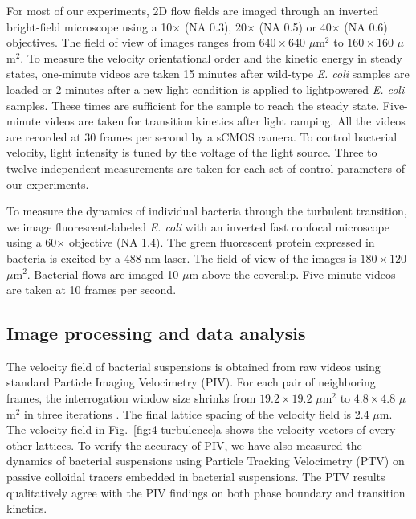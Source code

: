 For most of our experiments, 2D flow fields are imaged through an inverted bright-field microscope using a 10$\times$ (NA 0.3), 20$\times$ (NA 0.5) or 40$\times$ (NA 0.6) objectives. The field of view of images ranges from $640 \times 640$ $\mu$m$^2$ to $160 \times 160$ $\mu$m$^2$. To measure the velocity orientational order and the kinetic energy in steady states, one-minute videos are taken 15 minutes after wild-type \textit{E. coli} samples are loaded or 2 minutes after a new light condition is applied to lightpowered \textit{E. coli} samples. These times are sufficient for the sample to reach the steady state. Five-minute videos are taken for transition kinetics after light ramping. All the videos are recorded at 30 frames per second by a sCMOS camera. To control bacterial velocity, light intensity is tuned by the voltage of the light source. Three to twelve independent measurements are taken for each set of control parameters of our experiments.

To measure the dynamics of individual bacteria through the turbulent transition, we image fluorescent-labeled \textit{E. coli} with an inverted fast confocal microscope using a 60$\times$ objective (NA 1.4). The green fluorescent protein expressed in bacteria is excited by a 488 nm laser. The field of view of the images is $180 \times 120$ $\mu$m$^2$. Bacterial flows are imaged 10 $\mu$m above the coverslip. Five-minute videos are taken at 10 frames per second.

\subsection{Image processing and data analysis}
The velocity field of bacterial suspensions is obtained from raw videos using standard Particle Imaging Velocimetry (PIV). For each pair of neighboring frames, the interrogation window size shrinks from $19.2 \times 19.2$ $\mu$m$^2$ to $4.8 \times 4.8$ $\mu$m$^2$ in three iterations \cite{Scarano2001}. The final lattice spacing of the velocity field is 2.4 $\mu$m. The velocity field in Fig.~\ref{fig:4-turbulence}a shows the velocity vectors of every other lattices. To verify the accuracy of PIV,
we have also measured the dynamics of bacterial suspensions using Particle Tracking Velocimetry (PTV) on passive colloidal tracers embedded in bacterial suspensions. The PTV results qualitatively agree with the PIV findings on both phase boundary and transition kinetics.

